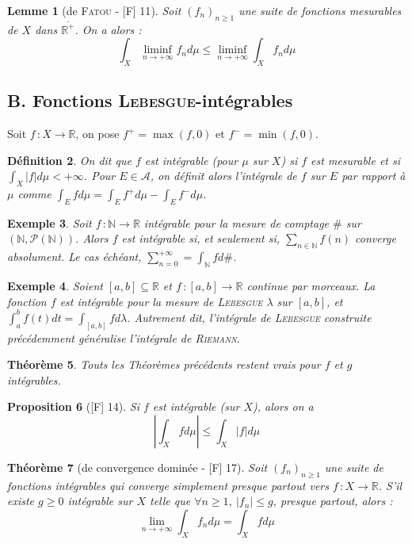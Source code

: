 \documentclass[10pt, a4paper, parskip=full, twoside, twocolumn]{report}
\newtheorem{definition}{Définition}
\newtheorem{theorem}[definition]{Théorème}
\newtheorem{proposition}[definition]{Proposition}
\newtheorem{lemma}[definition]{Lemme}
\newtheorem{example}[definition]{Exemple}
\newcommand{\IN}{\mathbb{N}}
\newcommand{\IR}{\mathbb{R}}
\newcommand{\A}{\mathscr{A}}
\begin{document}
\begin{lemma}[de \textsc{Fatou} - \textnormal{[F] 11}]
	Soit $\left(f_n\right)_{n\geq 1}$ une suite de fonctions mesurables de $X$ dans $\overline{\IR^+}$.
	On a alors :
	$$\int_X \liminf_{n\to +\infty} f_nd\mu \leq \liminf_{n\to +\infty} \int_X f_nd\mu$$
\end{lemma}

\subsection*{B. Fonctions \textsc{Lebesgue}-intégrables}
\textcolor{paragraphtext}{Soit $f\,\colon X\to \IR$, on pose $f^+=\max (f,0)$ et $f^- = \min (f,0)$.}

\begin{definition}
	On dit que $f$ est \emph{intégrable (pour $\mu$ sur $X$)} si $f$ est mesurable et si $\int_X \vert f \vert d\mu < +\infty$.
	Pour $E\in \A$, on définit alors l'\emph{intégrale de $f$ sur $E$ par rapport à $\mu$} comme $\int_E fd\mu = \int_E f^+d\mu - \int_E f^-d\mu$.
\end{definition}

\begin{example}
	Soit $f\,\colon \IN\to \IR$ intégrable pour la mesure de comptage $\#$ sur $(\IN,\mathcal{P}(\IN))$.
	Alors $f$ est intégrable si, et seulement si, $\sum_{n\in\IN} f(n)$ converge absolument.
	Le cas échéant, $\sum_{n=0}^{+\infty} = \int_{\IN}fd\#$.
\end{example}

\begin{example}
	Soient $[a,b]\subseteq \IR$ et $f\,\colon [a,b]\to \IR$ continue par morceaux. La fonction $f$ est intégrable pour la mesure de 
	\textsc{Lebesgue} $\lambda$ sur $[a,b]$, et $\int_{a}^{b} f(t)dt = \int_{[a,b]} fd\lambda$.
	Autrement dit, l'intégrale de \textsc{Lebesgue} construite précédemment généralise l'intégrale de \textsc{Riemann}.
\end{example}

\begin{theorem}
	Touts les Théorèmes précédents restent vrais pour $f$ et $g$ intégrables.
\end{theorem}

\begin{proposition}[\textnormal{[F] 14}]
	Si $f$ est intégrable (sur $X$), alors on a 
	$$\left\lvert\int_X fd\mu \right\rvert \leq \int_X \vert f \vert d\mu$$
\end{proposition}

\begin{theorem}[de convergence dominée - \textnormal{[F] 17}]
	Soit $\left(f_n\right)_{n\geq 1}$ une suite de fonctions intégrables qui converge simplement presque partout vers $f\,\colon X\to \IR$.
	S'il existe $g\geq 0$ intégrable sur $X$ telle que $\forall n\geq 1$, $\lvert f_n \rvert \leq g$, presque partout, alors :
	$$\lim_{n\to +\infty} \int_X f_nd\mu = \int_X fd\mu$$
\end{theorem}
\end{document}
